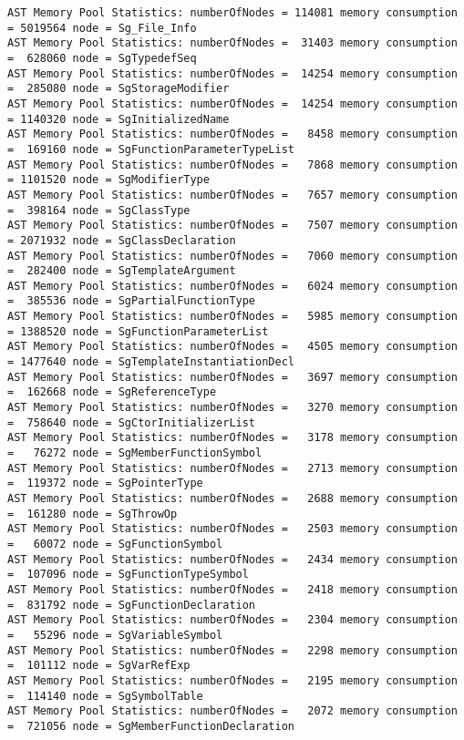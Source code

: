 {\mySmallestFontSize
\begin{verbatim}
AST Memory Pool Statistics: numberOfNodes = 114081 memory consumption = 5019564 node = Sg_File_Info
AST Memory Pool Statistics: numberOfNodes =  31403 memory consumption =  628060 node = SgTypedefSeq
AST Memory Pool Statistics: numberOfNodes =  14254 memory consumption =  285080 node = SgStorageModifier
AST Memory Pool Statistics: numberOfNodes =  14254 memory consumption = 1140320 node = SgInitializedName
AST Memory Pool Statistics: numberOfNodes =   8458 memory consumption =  169160 node = SgFunctionParameterTypeList
AST Memory Pool Statistics: numberOfNodes =   7868 memory consumption = 1101520 node = SgModifierType
AST Memory Pool Statistics: numberOfNodes =   7657 memory consumption =  398164 node = SgClassType
AST Memory Pool Statistics: numberOfNodes =   7507 memory consumption = 2071932 node = SgClassDeclaration
AST Memory Pool Statistics: numberOfNodes =   7060 memory consumption =  282400 node = SgTemplateArgument
AST Memory Pool Statistics: numberOfNodes =   6024 memory consumption =  385536 node = SgPartialFunctionType
AST Memory Pool Statistics: numberOfNodes =   5985 memory consumption = 1388520 node = SgFunctionParameterList
AST Memory Pool Statistics: numberOfNodes =   4505 memory consumption = 1477640 node = SgTemplateInstantiationDecl
AST Memory Pool Statistics: numberOfNodes =   3697 memory consumption =  162668 node = SgReferenceType
AST Memory Pool Statistics: numberOfNodes =   3270 memory consumption =  758640 node = SgCtorInitializerList
AST Memory Pool Statistics: numberOfNodes =   3178 memory consumption =   76272 node = SgMemberFunctionSymbol
AST Memory Pool Statistics: numberOfNodes =   2713 memory consumption =  119372 node = SgPointerType
AST Memory Pool Statistics: numberOfNodes =   2688 memory consumption =  161280 node = SgThrowOp
AST Memory Pool Statistics: numberOfNodes =   2503 memory consumption =   60072 node = SgFunctionSymbol
AST Memory Pool Statistics: numberOfNodes =   2434 memory consumption =  107096 node = SgFunctionTypeSymbol
AST Memory Pool Statistics: numberOfNodes =   2418 memory consumption =  831792 node = SgFunctionDeclaration
AST Memory Pool Statistics: numberOfNodes =   2304 memory consumption =   55296 node = SgVariableSymbol
AST Memory Pool Statistics: numberOfNodes =   2298 memory consumption =  101112 node = SgVarRefExp
AST Memory Pool Statistics: numberOfNodes =   2195 memory consumption =  114140 node = SgSymbolTable
AST Memory Pool Statistics: numberOfNodes =   2072 memory consumption =  721056 node = SgMemberFunctionDeclaration

\end{verbatim}}
